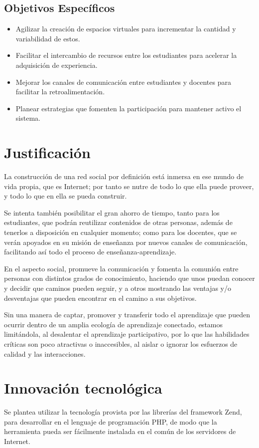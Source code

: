 \subsection{Objetivos Específicos}
\begin{itemize}
\item Agilizar la creación de espacios virtuales para incrementar la cantidad y
variabilidad de estos.
\item Facilitar el intercambio de recursos entre los estudiantes para acelerar
la adquisición de experiencia.
\item Mejorar los canales de comunicación entre estudiantes y docentes para
facilitar la retroalimentación.
\item Planear estrategias que fomenten la participación para mantener activo el
sistema.
\end{itemize}

\section{Justificación}
La construcción de una red social por definición está inmersa en ese mundo de
vida propia, que es Internet; por tanto se nutre de todo lo que ella puede
proveer, y todo lo que en ella se pueda construir.

Se intenta también posibilitar el gran ahorro de tiempo, tanto para los
estudiantes, que podrán reutilizar contenidos de otras personas, además de
tenerlos a disposición en cualquier momento; como para los docentes, que se
verán apoyados en su misión de enseñanza por nuevos canales de comunicación,
facilitando así todo el proceso de enseñanza-aprendizaje.

En el aspecto social, promueve la comunicación y fomenta la comunión entre
personas con distintos grados de conocimiento, haciendo que unos puedan conocer
y decidir que caminos pueden seguir, y a otros mostrando las ventajas y/o
desventajas que pueden encontrar en el camino a sus objetivos.

Sin una manera de captar, promover y transferir todo el aprendizaje que pueden
ocurrir dentro de un amplia ecología de aprendizaje conectado, estamos
limitándola, al desalentar el aprendizaje participativo, por lo que las
habilidades críticas son poco atractivas o inaccesibles, al aislar o ignorar
los esfuerzos de calidad y las interacciones\cite{Santamaria}.

\section{Innovación tecnológica}
Se plantea utilizar la tecnología provista por las librerías del framework
Zend, para desarrollar en el lenguaje de programación PHP, de modo que la
herramienta pueda ser fácilmente instalada en el común de los servidores de
Internet.

